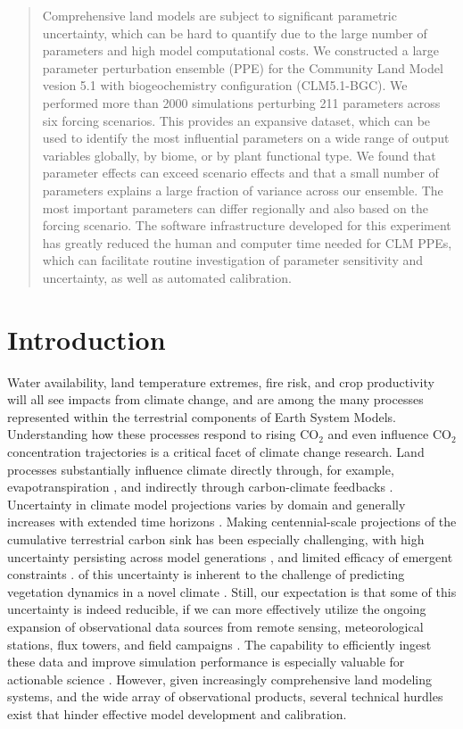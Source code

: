 \documentclass[draft]{agujournal2019}
\begin{document}
\begin{abstract}
Comprehensive land models are subject to significant parametric uncertainty, which can be hard to quantify due to the large number of parameters and high model computational costs. We constructed a large parameter perturbation ensemble (PPE) for the Community Land Model vesion 5.1 with biogeochemistry configuration (CLM5.1-BGC). We performed more than 2000 simulations perturbing 211 parameters across six forcing scenarios. This provides an expansive dataset, which can be used to identify the most influential parameters on a wide range of output variables globally, by biome, or by plant functional type. We found that parameter effects can exceed scenario effects and that a small number of parameters explains a large fraction of variance across our ensemble. The most important parameters can differ regionally and also based on the forcing scenario. The software infrastructure developed for this experiment has greatly reduced the human and computer time needed for CLM PPEs, which can facilitate routine investigation of parameter sensitivity and uncertainty, as well as automated calibration.
\end{abstract}


\section{Introduction}
Water availability, land temperature extremes, fire risk, and crop productivity will all see impacts from climate change, and are among the many processes represented within the terrestrial components of Earth System Models. Understanding how these processes respond to rising CO$_2$ and even influence CO$_2$ concentration trajectories is a critical facet of climate change research. Land processes substantially influence climate directly through, for example, evapotranspiration \cite{zarakas2024}, and indirectly through carbon-climate feedbacks \cite{cox2000}.
Uncertainty in climate model projections varies by domain and generally increases with extended time horizons \cite{koven2022}. 
Making centennial-scale projections of the cumulative terrestrial carbon sink has been especially challenging, with high uncertainty persisting across model generations \cite{friedlingstein2006,friedlingstein2014,arora2020}, and limited efficacy of emergent constraints \cite{liu2024}.   of this uncertainty is  inherent to the challenge of predicting vegetation dynamics in a novel climate \cite{lovenduski2017}. Still, our expectation is that some of this uncertainty is indeed reducible, if we can more effectively utilize the ongoing expansion of observational data sources from remote sensing, meteorological stations, flux towers, and field campaigns \cite{worden2021,baldocchi2024}. The capability to efficiently ingest these data and improve simulation performance  is especially valuable for actionable science \cite{cheng2023}. However, given increasingly comprehensive land modeling systems, and the wide array of observational products, several technical hurdles exist that hinder effective model development and calibration.
\end{document}

